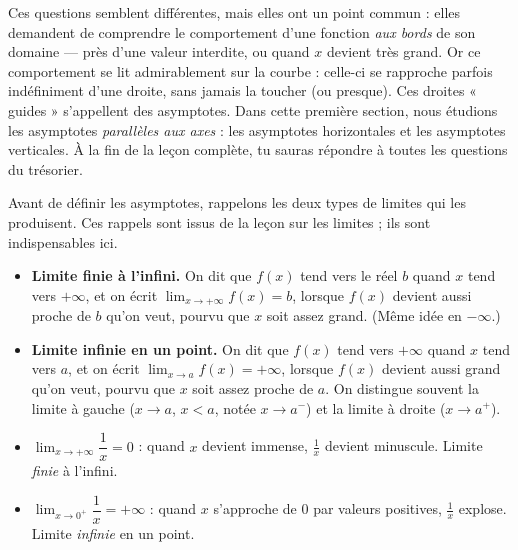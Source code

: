 \documentclass[11pt]{article}
\newcommand{\cle}[1]{{\popxbold\color{popdark}#1}}
\newcounter{popsec}
\newcounter{popsub}
\newcommand{\courssub}[1]{%
  \stepcounter{popsub}%
  \par\vspace{9pt}\noindent{\popxbold\fontsize{11.5}{13}\selectfont\color{popink}{\color{poporange}\thepopsec.\thepopsub}\hspace{6pt}#1}\par\nopagebreak\vspace{4pt}
}
\begin{document}
Ces questions semblent différentes, mais elles ont un point commun : elles demandent de comprendre le \cle{comportement} d'une fonction \emph{aux bords} de son domaine — près d'une valeur interdite, ou quand $x$ devient très grand. Or ce comportement se lit admirablement sur la courbe : celle-ci se rapproche parfois indéfiniment d'une droite, sans jamais la toucher (ou presque). Ces droites « guides » s'appellent des \cle{asymptotes}. Dans cette première section, nous étudions les asymptotes \emph{parallèles aux axes} : les asymptotes horizontales et les asymptotes verticales. À la fin de la leçon complète, tu sauras répondre à toutes les questions du trésorier.

\courssub{Rappels sur les limites}

Avant de définir les asymptotes, rappelons les deux types de limites qui les produisent. Ces rappels sont issus de la leçon sur les limites ; ils sont indispensables ici.

\begin{aretenir}
\begin{itemize}
\item \textbf{Limite finie à l'infini.} On dit que $f(x)$ tend vers le réel $b$ quand $x$ tend vers $+\infty$, et on écrit $\lim_{x \to +\infty} f(x) = b$, lorsque $f(x)$ devient aussi proche de $b$ qu'on veut, pourvu que $x$ soit assez grand. (Même idée en $-\infty$.)
\item \textbf{Limite infinie en un point.} On dit que $f(x)$ tend vers $+\infty$ quand $x$ tend vers $a$, et on écrit $\lim_{x \to a} f(x) = +\infty$, lorsque $f(x)$ devient aussi grand qu'on veut, pourvu que $x$ soit assez proche de $a$. On distingue souvent la limite à gauche ($x \to a$, $x < a$, notée $x \to a^-$) et la limite à droite ($x \to a^+$).
\end{itemize}
\end{aretenir}

\begin{exemplebox}
\begin{itemize}
\item $\lim_{x \to +\infty} \dfrac{1}{x} = 0$ : quand $x$ devient immense, $\frac{1}{x}$ devient minuscule. Limite \emph{finie} à l'infini.
\item $\lim_{x \to 0^+} \dfrac{1}{x} = +\infty$ : quand $x$ s'approche de $0$ par valeurs positives, $\frac{1}{x}$ explose. Limite \emph{infinie} en un point.
\end{itemize}
\end{exemplebox}
\end{document}
